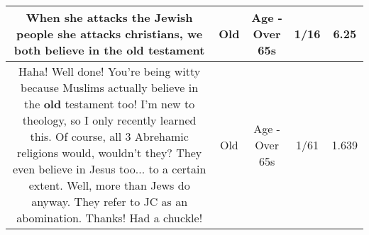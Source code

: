 \documentclass[11pt]{article}
\newlength\mylength
\begin{document}
\begin{center}
\begin{longtable}{|C{.65\mylength}|C{.30\mylength}|C{.12\mylength}|C{.12\mylength}|C{.12\mylength}|}
  \small When she attacks the Jewish people she attacks christians, we both believe in the \textbf{old} testament\normalsize   & Old & Age - Over 65s & 1/16 & 6.25 \\  \hline
  \small Haha! Well done! You're being witty because Muslims actually believe in the \textbf{old} testament too! I'm new to theology, so I only recently learned this. Of course, all 3 Abrehamic religions would, wouldn't they? They even believe in Jesus too... to a certain extent. Well, more than Jews do anyway. They refer to JC as an abomination. Thanks! Had a chuckle!\normalsize   & Old & Age - Over 65s & 1/61 & 1.639 \\  \hline

\end{longtable}
\end{center}
\end{document}
